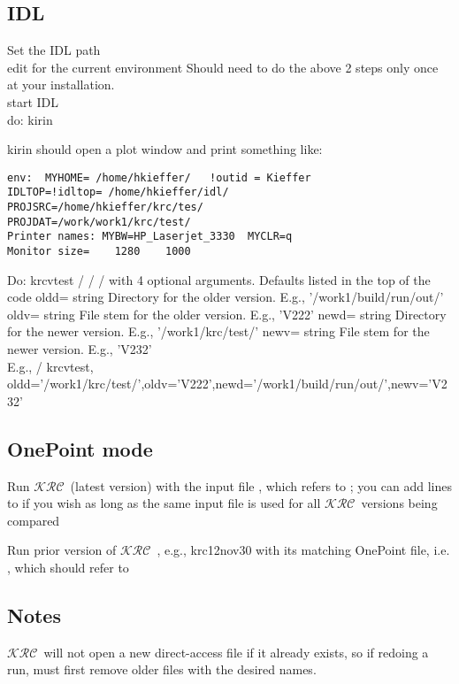 \documentclass{article}  %
\newcommand{\krc}{$\mathcal{KRC}$~}    %
\begin{document}
\subsection{IDL} 
Set the IDL path
\\ edit  for the current environment
\qi  Should need to do the above 2 steps only once at your installation.
\\ start IDL
\\ do:  kirin

kirin should open a plot window and print something like:
\vspace{-3.mm} 
\begin{verbatim}
env:  MYHOME= /home/hkieffer/   !outid = Kieffer
IDLTOP=!idltop= /home/hkieffer/idl/
PROJSRC=/home/hkieffer/krc/tes/
PROJDAT=/work/work1/krc/test/
Printer names: MYBW=HP_Laserjet_3330  MYCLR=q
Monitor size=    1280    1000
\end{verbatim}

Do: krcvtest / / / with 4 optional arguments. Defaults listed in the top of the code
\qii oldd= string Directory for the older version. E.g., '/work1/build/run/out/' 
\qii oldv= string  File stem for the older version. E.g., 'V222'
\qii newd= string  Directory for the newer version. E.g., '/work1/krc/test/'
\qii newv= string  File stem for the newer version. E.g., 'V232'
\\ E.g., /  krcvtest, oldd='/work1/krc/test/',oldv='V222',newd='/work1/build/run/out/',newv='V232'


\subsection{OnePoint mode} %
Run \krc (latest version) with the input file , which refers to ; you can add lines to   if you wish as long as the same input file is used for all \krc versions being compared

Run prior version of \krc, e.g.,  krc12nov30 with its matching OnePoint file, i.e.  , which should refer to  

\subsection{Notes} %

\krc will not open a new direct-access file if it already exists, so if redoing a run, must first remove older files with the desired names.
\end{document}
